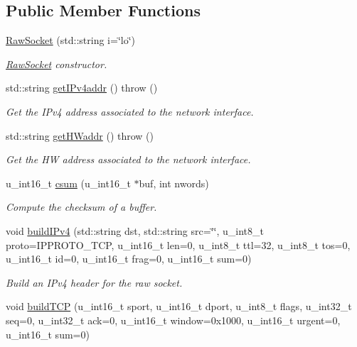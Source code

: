 \subsection*{Public Member Functions}
\begin{CompactItemize}
\item 
\hyperlink{classRawSocket_10fc562aa855e7f4b184af1d4f842ae0}{RawSocket} (std::string i=\char`\"{}lo\char`\"{})
\begin{CompactList}\small\item\em \hyperlink{classRawSocket}{RawSocket} constructor. \item\end{CompactList}\item 
std::string \hyperlink{classRawSocket_dda64a716b48c1527283c026bda208d6}{getIPv4addr} ()  throw ()
\begin{CompactList}\small\item\em Get the IPv4 address associated to the network interface. \item\end{CompactList}\item 
std::string \hyperlink{classRawSocket_b35260c4a551194b50925537785bcf47}{getHWaddr} ()  throw ()
\begin{CompactList}\small\item\em Get the HW address associated to the network interface. \item\end{CompactList}\item 
u\_\-int16\_\-t \hyperlink{classRawSocket_973b337d963bdcff3ce68d0ef7ffb7e1}{csum} (u\_\-int16\_\-t $\ast$buf, int nwords)
\begin{CompactList}\small\item\em Compute the checksum of a buffer. \item\end{CompactList}\item 
void \hyperlink{classRawSocket_9536928bd82c99ef2b615b0ffcb87f21}{buildIPv4} (std::string dst, std::string src=\char`\"{}\char`\"{}, u\_\-int8\_\-t proto=IPPROTO\_\-TCP, u\_\-int16\_\-t len=0, u\_\-int8\_\-t ttl=32, u\_\-int8\_\-t tos=0, u\_\-int16\_\-t id=0, u\_\-int16\_\-t frag=0, u\_\-int16\_\-t sum=0)
\begin{CompactList}\small\item\em Build an IPv4 header for the raw socket. \item\end{CompactList}\item 
void \hyperlink{classRawSocket_ba3cca3e8ff995d5edbf064b3af8ca05}{buildTCP} (u\_\-int16\_\-t sport, u\_\-int16\_\-t dport, u\_\-int8\_\-t flags, u\_\-int32\_\-t seq=0, u\_\-int32\_\-t ack=0, u\_\-int16\_\-t window=0x1000, u\_\-int16\_\-t urgent=0, u\_\-int16\_\-t sum=0)

\end{CompactItemize}
